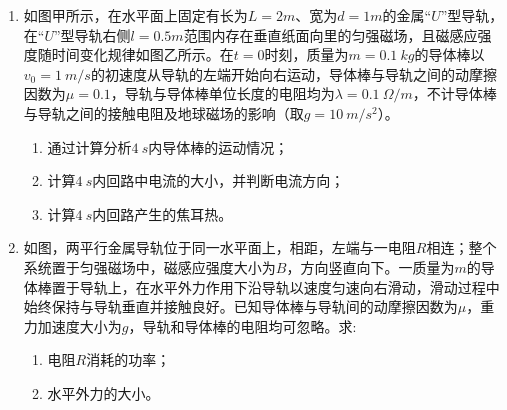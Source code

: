 \begin{enumerate}
\newpage
\item 
{}
如图甲所示，在水平面上固定有长为$ L=2m $、宽为$ d=1m $的金属“$ U $”型导轨，在“$ U $”型导轨右侧$ l=0.5m $范围内存在垂直纸面向里的匀强磁场，且磁感应强度随时间变化规律如图乙所示。在$ t=0 $时刻，质量为$ m=0.1 \ kg $的导体棒以$ v_0=1 \ m/s $的初速度从导轨的左端开始向右运动，导体棒与导轨之间的动摩擦因数为$ \mu =0.1 $，导轨与导体棒单位长度的电阻均为$ \lambda=0.1\ \Omega /m $，不计导体棒与导轨之间的接触电阻及地球磁场的影响（取$ g=10 \ m/s ^{2} $）。
\begin{enumerate}
\renewcommand{\labelenumi}{\arabic{enumi}.}
\item
通过计算分析$ 4 \ s $内导体棒的运动情况；
\item 
计算$ 4 \ s $内回路中电流的大小，并判断电流方向；
\item 
计算$ 4 \ s $内回路产生的焦耳热。



\end{enumerate}
\begin{figure}[h!]
\flushright 

\end{figure}



\item 
{}
如图，两平行金属导轨位于同一水平面上，相距，左端与一电阻$ R $相连；整个系统置于匀强磁场中，磁感应强度大小为$ B $，方向竖直向下。一质量为$ m $的导体棒置于导轨上，在水平外力作用下沿导轨以速度匀速向右滑动，滑动过程中始终保持与导轨垂直并接触良好。已知导体棒与导轨间的动摩擦因数为$ \mu $，重力加速度大小为$ g $，导轨和导体棒的电阻均可忽略。求:
\begin{enumerate}
\renewcommand{\labelenumi}{\arabic{enumi}.}
\item
电阻$ R $消耗的功率；
\item 
水平外力的大小。




\end{enumerate}
\end{enumerate}
